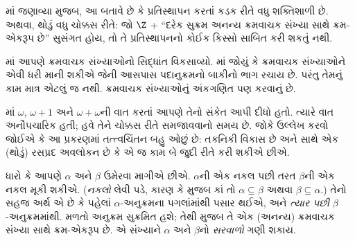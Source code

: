 માં જણાવ્યા મુજબ,
આ બતાવે છે કે પ્રતિસ્થાપન
 કરતાં
કડક રીતે વધુ શક્તિશાળી છે. અથવા, થોડું વધુ ચોક્કસ રીતે:
જો $\Z$ + ``દરેક સુક્રમ અનન્ય ક્રમવાચક સંખ્યા સાથે
ક્રમ-એકરૂપ છે'' સુસંગત હોય, તો તે પ્રતિસ્થાપનનો
કોઈક કિસ્સો સાબિત કરી શકતું નથી.
\endgroup


\OLEndChapterHook
\endgroup

\begingroup
\makeatletter{}\makeatother

\label{guunit:OLP-0574}


\begingroup
\makeatletter{}\makeatother


\label{guunit:OLP-0575}


માં આપણે ક્રમવાચક સંખ્યાઓનો
સિદ્ધાંત વિકસાવ્યો. માં જોયું કે
ક્રમવાચક સંખ્યાઓને એવી ધરી માની શકીએ જેની આસપાસ
પદાનુક્રમનો બાકીનો ભાગ રચાય છે. પરંતુ તેમનું કામ માત્ર
એટલું જ નથી. ક્રમવાચક સંખ્યાઓનું અંકગણિત પણ કરવાનું છે.

માં $\omega$,
$\omega+1$ અને $\omega+\omega$ની વાત કરતાં આપણે
તેનો સંકેત આપી દીધો હતો. ત્યારે વાત અનૌપચારિક હતી;
હવે તેને ચોક્કસ રીતે સમજાવવાનો સમય છે. જોકે ઉલ્લેખ
કરવો જોઈએ કે આ પ્રકરણમાં તત્ત્વચિંતન બહુ ઓછું છે:
તકનિકી વિકાસ છે અને સાથે એક (થોડું) રસપ્રદ અવલોકન
છે કે એ જ કામ બે જુદી રીતે કરી શકીએ છીએ.
\endgroup

\begingroup
\makeatletter{}\makeatother

\label{guunit:OLP-0576}


ધારો કે આપણે $\alpha$ અને $\beta$ ઉમેરવા માગીએ છીએ.
$\alpha$ની એક નકલ પછી તરત $\beta$ની એક નકલ
મૂકી શકીએ. (\emph{નકલો} લેવી પડે, કારણ કે
 મુજબ કાં તો
$\alpha
\subseteq \beta$ અથવા $\beta \subseteq \alpha$.)
તેનો સહજ અર્થ એ છે કે પહેલાં $\alpha$-અનુક્રમના
પગલાંમાંથી પસાર થઈએ, અને \emph{ત્યાર પછી}
$\beta$-અનુક્રમમાંથી. મળતો અનુક્રમ સુક્રમિત હશે; તેથી
મુજબ તે એક (અનન્ય) ક્રમવાચક સંખ્યા સાથે ક્રમ-એકરૂપ
છે. એ સંખ્યાને $\alpha$ અને $\beta$નો \emph{સરવાળો}
ગણી શકાય.

